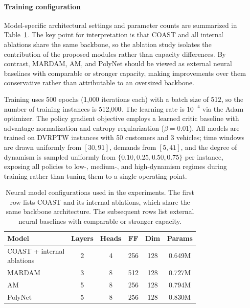 \documentclass[letterpaper]{article}
\begin{document}
\paragraph{Training configuration}
Model-specific architectural settings and parameter counts are summarized in Table~\ref{tab:model_config}. The key point for interpretation is that COAST and all internal ablations share the same backbone, so the ablation study isolates the contribution of the proposed modules rather than capacity differences. By contrast, MARDAM, AM, and PolyNet should be viewed as external neural baselines with comparable or stronger capacity, making improvements over them conservative rather than attributable to an oversized backbone.

Training uses 500 epochs (1,000 iterations each) with a batch size of 512, so the number of training instances is 512,000. The learning rate is $10^{-4}$ via the Adam optimizer. The policy gradient objective employs a learned critic baseline with advantage normalization and entropy regularization ($\beta = 0.01$). All models are trained on DVRPTW instances with 50 customers and 3 vehicles; time windows are drawn uniformly from $[30, 91]$, demands from $[5, 41]$, and the degree of dynamism is sampled uniformly from $\{0.10, 0.25, 0.50, 0.75\}$ per instance, exposing all policies to low-, medium-, and high-dynamism regimes during training rather than tuning them to a single operating point.

\begin{table}[t]
\centering
{\small
\setlength{\tabcolsep}{1.5pt}
\begin{tabular}{lccccc}
\toprule
Model & Layers & Heads & FF & Dim & Params \\
\midrule
\shortstack[l]{COAST + internal\\ablations} & 2 & 4 & 256 & 128 & 0.649M  \\
MARDAM & 3 & 8 & 512 & 128 & 0.727M  \\
AM & 5 & 8 & 256 & 128 & 0.794M  \\
PolyNet & 5 & 8 & 256 & 128 & 0.830M  \\
\bottomrule
\end{tabular}
}
\caption{Neural model configurations used in the experiments. The first row lists COAST and its internal ablations, which share the same backbone architecture. The subsequent rows list external neural baselines with comparable or stronger capacity.}
\label{tab:model_config}
\end{table}
\end{document}
